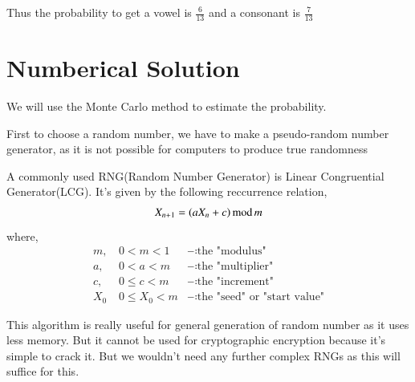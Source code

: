 \documentclass[journal]{IEEEtran}
\begin{document}
    Thus the probability to get a vowel is $\frac{6}{13}$ and a consonant is $\frac{7}{13}$
\section{Numberical Solution}
    We will use the Monte Carlo method to estimate the probability.

    First to choose a random number, we have to make a pseudo-random number generator, as it is not possible for computers to produce true randomness

    A commonly used RNG(Random Number Generator) is Linear Congruential Generator(LCG). It's given by the following reccurrence relation,
    \begin{align}
        X_{n+1} = \left(aX_n+c\right)\text{mod}\,m
    \end{align}
    where,
    \begin{align}
        m,\,& 0<m<1&\dashcolon \text{the "modulus"}\\
        a,\,& 0<a<m&\dashcolon\text{the "multiplier"}\\
        c,\,& 0\leq c<m&\dashcolon\text{the "increment"}\\
        X_0\,&0\leq X_0<m&\dashcolon\text{the "seed" or "start value"}
    \end{align}

    This algorithm is really useful for general generation of random number as it uses less memory. But it cannot be used for cryptographic encryption because it's simple to crack it.
    But we wouldn't need any further complex RNGs as this will suffice for this.
\end{document}
